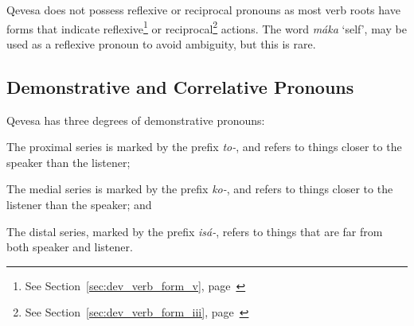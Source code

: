 \documentclass[grammar]{subfiles}
\begin{document}
	Qevesa does not possess reflexive or reciprocal pronouns as most verb roots have forms that indicate reflexive\footnote{See  Section~\ref{sec:dev_verb_form_v}, page~\pageref{sec:dev_verb_form_v}} or reciprocal\footnote{See  Section~\ref{sec:dev_verb_form_iii}, page~\pageref{sec:dev_verb_form_iii}} actions. The word \emph{máka} ‘self’, may be used as a reflexive pronoun to avoid ambiguity, but this is rare.



	\subsection{Demonstrative and Correlative Pronouns}
	\label{ssec:nm_demonstrative_pronouns}

	Qevesa has three degrees of demonstrative pronouns:

	\begin{description}[style=nextline]
		\item[Proximal] The proximal series is marked by the prefix \emph{to-}, and refers to things closer to the speaker than the listener;
		\item[Medial] The medial series is marked by the prefix \emph{ko-}, and refers to things closer to the listener than the speaker; and
		\item[Distal] The distal series, marked by the prefix \emph{isá-}, refers to things that are far from both speaker and listener.
	\end{description}
\end{document}
